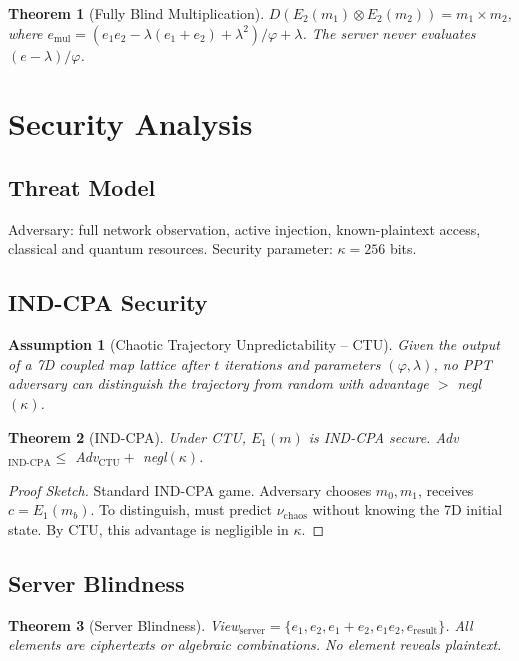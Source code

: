 \documentclass{article}
\newtheorem{theorem}{Theorem}[section]
\newtheorem{assumption}{Assumption}[section]
\begin{document}
\begin{theorem}[Fully Blind Multiplication]
$D(E_2(m_1) \otimes E_2(m_2)) = m_1 \times m_2$, where $e_{\text{mul}} = (e_1 e_2 - \lambda(e_1 + e_2) + \lambda^2)/\varphi + \lambda$. The server never evaluates $(e - \lambda)/\varphi$.
\end{theorem}

\section{Security Analysis}

\subsection{Threat Model}
Adversary: full network observation, active injection, known-plaintext access, classical and quantum resources. Security parameter: $\kappa = 256$ bits.

\subsection{IND-CPA Security}

\begin{assumption}[Chaotic Trajectory Unpredictability -- CTU]
Given the output of a 7D coupled map lattice after $t$ iterations and parameters $(\varphi, \lambda)$, no PPT adversary can distinguish the trajectory from random with advantage $>$ negl$(\kappa)$.
\end{assumption}

\begin{theorem}[IND-CPA]
Under CTU, $E_1(m)$ is IND-CPA secure. Adv$_{\text{IND-CPA}} \leq$ Adv$_{\text{CTU}} +$ negl$(\kappa)$.
\end{theorem}

\begin{proof}[Proof Sketch]
Standard IND-CPA game. Adversary chooses $m_0, m_1$, receives $c = E_1(m_b)$. To distinguish, must predict $\nu_{\text{chaos}}$ without knowing the 7D initial state. By CTU, this advantage is negligible in $\kappa$.
\end{proof}

\subsection{Server Blindness}

\begin{theorem}[Server Blindness]
View$_{\text{server}} = \{e_1, e_2, e_1+e_2, e_1 e_2, e_{\text{result}}\}$. All elements are ciphertexts or algebraic combinations. No element reveals plaintext.
\end{theorem}
\end{document}
